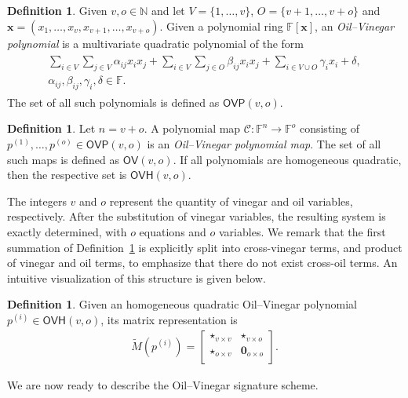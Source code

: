 \documentclass[draft, 12pt, a4paper, oneside]{memoir}
\theoremstyle{definition}
\newtheorem{definition}[theorem]{Definition}
\begin{document}
\begin{definition}\label{def:ovp}
  Given $v, o \in \mathbb{N}$ and let $V = \{1, \dots, v\}$, $O = \{v + 1, \dots, v + o\}$ and $\mathbf{x} = (x_{1}, \dots, x_{v}, x_{v + 1}, \dots, x_{v + o})$. Given a polynomial ring $\mathbb{F}[\mathbf{x}]$, an \emph{Oil--Vinegar polynomial} is a multivariate quadratic polynomial of the form
  \begin{align}
    \begin{split}
      \sum_{i \in V} \sum_{j \in V} \alpha_{ij} x_{i} x_{j}
        + \sum_{i \in V} \sum_{j \in O} \beta_{ij} x_{i} x_{j}
        + \sum_{i \in V \cup O} \gamma_{i} x_{i}
        + \delta, \\
      \alpha_{ij}, \beta_{ij}, \gamma_{i}, \delta \in \mathbb{F}.
    \end{split}
  \end{align}
  The set of all such polynomials is defined as $\mathsf{OVP}(v, o)$.
\end{definition}

\begin{definition}
  Let $n = v + o$. A polynomial map $\mathcal{C} : \mathbb{F}^{n} \to \mathbb{F}^{o}$ consisting of $p^{(1)}, \dots, p^{(o)} \in \mathsf{OVP}(v, o)$ is an \emph{Oil--Vinegar polynomial map}. The set of all such maps is defined as $\mathsf{OV}(v, o)$. If all polynomials are homogeneous quadratic, then the respective set is $\mathsf{OVH}(v, o)$.
\end{definition}

The integers $v$ and $o$ represent the quantity of vinegar and oil variables, respectively. After the substitution of vinegar variables, the resulting system is exactly determined, with $o$ equations and $o$ variables. We remark that the first summation of Definition~\ref{def:ovp} is explicitly split into cross-vinegar terms, and product of vinegar and oil terms, to emphasize that there do not exist cross-oil terms. An intuitive visualization of this structure is given below.

\begin{definition}
  Given an homogeneous quadratic Oil--Vinegar polynomial $p^{(i)} \in \mathsf{OVH}(v, o)$, its matrix representation is
  \begin{align*}
    \widetilde{M}(p^{(i)}) =
    \begin{bmatrix}
      \star_{v \times v} & \star_{v \times o} \\
      \star_{o \times v} & \mathbf{0}_{o \times o} \\
    \end{bmatrix}.
  \end{align*}
\end{definition}
We are now ready to describe the Oil--Vinegar signature scheme.
\end{document}

